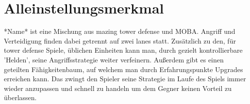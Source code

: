 \section{Alleinstellungsmerkmal}


*Name* ist eine Mischung aus mazing tower defense und MOBA.
Angriff und Verteidigung finden dabei getrennt auf zwei lanes statt.
Zusätzlich zu den, für tower defense Spiele, üblichen Einheiten kann man, durch gezielt kontrollierbare 'Helden', seine Angriffsstrategie weiter verfeinern.
Außerdem gibt es einen geteilten Fähigkeitenbaum, auf welchem man durch Erfahrungspunkte Upgrades erreichen kann. Das zwingt den Spieler seine Strategie im Laufe des Spiels immer wieder anzupassen und schnell zu handeln um dem Gegner keinen Vorteil zu überlassen.
